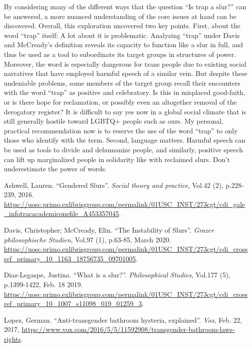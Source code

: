 \documentclass[12pt, letterpaper]{article}
\begin{document}
\begin{mla}
By considering many of the different ways that the question ``Is trap a
slur?'' can be answered, a more nuanced understanding of the core issues at
hand can be discovered. Overall, this exploration uncovered two key points.
First, about the word ``trap'' itself: A lot about it is problematic.
Analyzing ``trap'' under Davis and McCready's definition reveals its capacity
to function like a slur in full, and thus be used as a tool to subordinate
its target groups in structures of power. Moreover, the word is especially
dangerous for trans people due to existing social narratives that have
employed harmful speech of a similar vein. But despite these undeniable
problems, some members of the target group recall their encounters with the
word ``trap'' as positive and celebratory. Is this in misplaced good-faith,
or is there hope for reclamation, or possibly even an altogether removal of
the derogatory register? It is difficult to say yes now in a global social
climate that is still generally hostile toward LGBTQ+ people such as ours. My
personal, practical recommendation now is to reserve the use of the word
``trap'' to only those who identify with the term. Second, language matters.
Harmful speech can be used as tools to divide and dehumanize people, and
similarly, positive speech can lift up marginalized people in solidarity like
with reclaimed slurs. Don't underestimate the power of words.


\begin{workscited}
	\bibent Ashwell, Lauren. ``Gendered Slurs''.
	\textit{Social theory and practice}, Vol.42 (2), p.228-239, 2016.
	\url{https://uosc.primo.exlibrisgroup.com/permalink/01USC_INST/273cgt/cdi_gale_infotracacademiconefile_A453357045}.

	\bibent Davis, Christopher; McCready, Elin. ``The Instability of Slurs''.
	\textit{Grazer philosophische Studien}, Vol.97 (1), p.63-85, March 2020.
	\url{https://uosc.primo.exlibrisgroup.com/permalink/01USC_INST/273cgt/cdi_crossref_primary_10_1163_18756735_09701005}.

	\bibent Diaz-Legaspe, Justina. ``What is a slur?''.
	\textit{Philosophical Studies}, Vol.177 (5), p.1399-1422, Feb. 18 2019.
	\url{https://uosc.primo.exlibrisgroup.com/permalink/01USC_INST/273cgt/cdi_crossref_primary_10_1007_s11098_019_01259_3}.

	\bibent Lopez, German. ``Anti-transgender bathroom hysteria, explained''.
	\textit{Vox}, Feb. 22, 2017,
	\url{https://www.vox.com/2016/5/5/11592908/transgender-bathroom-laws-rights}.
	

\end{workscited}
\end{mla}
\end{document}
